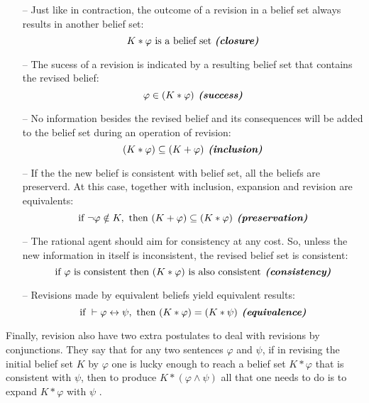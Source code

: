 \begin{enumerate}
    \item [--] Just like in contraction, the outcome of a revision in a belief set always results in another belief set:
    $$K * \varphi \text{ is a belief set \textbf{\textit{(closure)}}}$$

    \item [--] The sucess of a revision is indicated by a resulting belief set that contains the revised belief:
    $$\varphi \in (K * \varphi) \textbf{\textit{ (success)}}$$
    
    \item [--] No information besides the revised belief and its consequences will be added to the belief set during an operation of revision:
    $$(K * \varphi) \subseteq (K + \varphi) \textbf{\textit{ (inclusion)}}$$
    
    \item [--] If the the new belief is consistent with belief set, all the beliefs are preserverd. At this case, together with inclusion, expansion and revision are equivalents:
    $$\text{if } \neg \varphi \notin K, \text{ then } (K + \varphi) \subseteq (K * \varphi) \textbf{\textit{ (preservation)}}$$
    
    \item [--] The rational agent should aim for consistency at any cost. So, unless the new information in itself is inconsistent, the revised belief set is consistent:
    $$\text{if } \varphi \text{ is consistent then } (K * \varphi) \text{ is also consistent} \textbf{\textit{ (consistency)}}$$
    
    \item [--] Revisions made by equivalent beliefs yield equivalent results:
    $$\text{if } \vdash \varphi \leftrightarrow \psi, \text{ then } (K * \varphi) = (K * \psi) \textbf{\textit{ (equivalence)}}$$
\end{enumerate}

Finally, revision also have two extra postulates to deal with revisions by conjunctions. They say that for any two sentences $\varphi$ and $\psi$, if in revising the initial belief set $K$ by $\varphi$ one is lucky enough to reach a belief set $K * \varphi$ that is consistent with $\psi$, then to produce $K * (\varphi \wedge \psi)$ all that one needs to do is to expand $K * \varphi$ with $\psi$ \citep{Peppas2008}.

